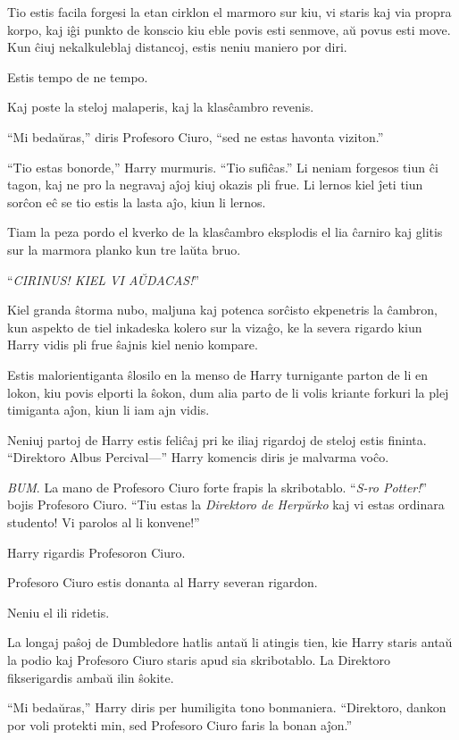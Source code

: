 Tio estis facila forgesi la etan cirklon el marmoro sur kiu, vi staris
kaj via propra korpo, kaj iĝi punkto de konscio kiu eble povis esti
senmove, aŭ povus esti move. Kun ĉiuj nekalkuleblaj distancoj, estis
neniu maniero por diri.

Estis tempo de ne tempo.

Kaj poste la steloj malaperis, kaj la klasĉambro revenis.

``Mi bedaŭras,'' diris Profesoro Ciuro, ``sed ne estas havonta viziton.''

``Tio estas bonorde,'' Harry murmuris. ``Tio sufiĉas.'' Li neniam
forgesos tiun ĉi tagon, kaj ne pro la negravaj aĵoj kiuj okazis pli
frue. Li lernos kiel ĵeti tiun sorĉon eĉ se tio estis la lasta aĵo,
kiun li lernos.

Tiam la peza pordo el kverko de la klasĉambro eksplodis el lia ĉarniro
kaj glitis sur la marmora planko kun tre laŭta bruo.

``\emph{CIRINUS! KIEL VI AŬDACAS!}''

Kiel granda ŝtorma nubo, maljuna kaj potenca sorĉisto ekpenetris la
ĉambron, kun aspekto de tiel inkadeska kolero sur la vizaĝo, ke la
severa rigardo kiun Harry vidis pli frue ŝajnis kiel nenio kompare.

Estis malorientiganta ŝlosilo en la menso de Harry turnigante parton
de li en lokon, kiu povis elporti la ŝokon, dum alia parto de li volis
kriante forkuri la plej timiganta aĵon, kiun li iam ajn vidis.

Neniuj partoj de Harry estis feliĉaj pri ke iliaj rigardoj de steloj
estis fininta. ``Direktoro Albus Percival—'' Harry komencis diris je
malvarma voĉo.

\emph{BUM}. La mano de Profesoro Ciuro forte frapis la
skribotablo. ``\emph{S-ro Potter!}'' bojis Profesoro Ciuro. ``Tiu
estas la \emph{Direktoro de Herpŭrko} kaj vi estas ordinara studento!
Vi parolos al li konvene!''

Harry rigardis Profesoron Ciuro.

Profesoro Ciuro estis donanta al Harry severan rigardon.

Neniu el ili ridetis.

La longaj paŝoj de Dumbledore hatlis antaŭ li atingis tien, kie Harry
staris antaŭ la podio kaj Profesoro Ciuro staris apud sia
skribotablo. La Direktoro fikserigardis ambaŭ ilin ŝokite.

``Mi bedaŭras,'' Harry diris per humiligita tono
bonmaniera. ``Direktoro, dankon por voli protekti min, sed Profesoro
Ciuro faris la bonan aĵon.''

